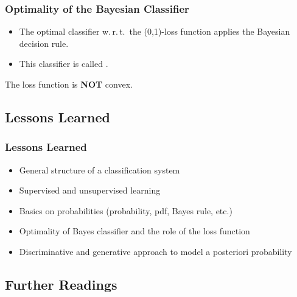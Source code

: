 \begin{frame}
	\frametitle{Optimality of the Bayesian Classifier \cont}


	\begin{itemize}
		\item The optimal classifier w.\,r.\,t.\ the (0,1)-loss function applies the Bayesian decision rule.
		\item This classifier is called . \\[.75cm]
	\end{itemize}
	\spread

	\vorsicht The loss function is {\bf NOT} convex. \vfill
\end{frame}


\subsection{Lessons Learned}

\begin{frame}
	\frametitle{Lessons Learned}

	\begin{itemize}
		\item General structure of a classification system \\[.5cm] \pause
		\item Supervised and unsupervised learning \\[.5cm] \pause
		\item Basics on probabilities (probability, pdf, Bayes rule, etc.) \\[.5cm] \pause
		\item Optimality of Bayes classifier and the role of the loss function \\[.5cm] \pause
		\item Discriminative and generative approach to model a posteriori probability
	\end{itemize}
\end{frame}



\subsection{Further Readings}

